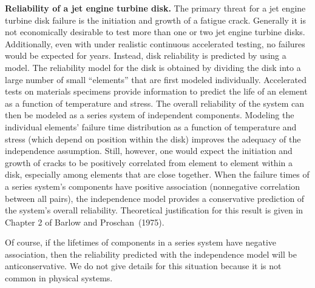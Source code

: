 \begin{example}
{\bf Reliability of a jet engine turbine disk.}  The primary threat
for a jet engine turbine disk failure is the initiation and growth
of a fatigue crack. Generally it is not economically desirable to
test more than one or two jet engine turbine disks.  Additionally,
even with under realistic continuous accelerated testing, no
failures would be expected for years. Instead, disk reliability is
predicted by using a model.  The reliability model for the disk is
obtained by dividing the disk into a large number of small
``elements'' that are first modeled individually.  Accelerated tests
on materials specimens provide information to predict the life of an
element as a function of temperature and stress. The overall
reliability of the system can then be modeled as a series system of
independent components. Modeling the individual elements' failure
time distribution as a function of temperature and stress (which
depend on position within the disk) improves the adequacy of the
independence assumption. Still, however, one would expect the
initiation and growth of cracks to be positively correlated from
element to element within a disk, especially among elements that are
close together.  When the failure times of a series system's
components have positive association (nonnegative correlation
between all pairs), the independence model provides a conservative
prediction of the system's overall reliability.  Theoretical
justification for this result is given in Chapter 2 of Barlow and
Proschan~(1975).
\end{example}

Of course, if the lifetimes of components in a series system have
negative association, then the reliability predicted with the independence
model will be anticonservative.  We do not give details for this
situation because it is not common in physical systems.

